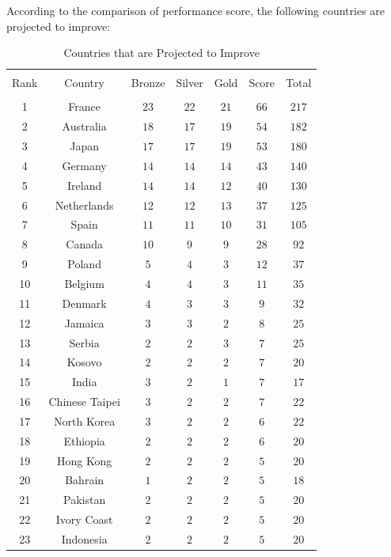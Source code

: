 \documentclass{mcmthesis}
\begin{document}
According to the comparison of performance score, the following countries are projected to improve:

\begin{longtable}{@{\extracolsep{5pt}} ccccccc} 
  \caption{Countries that are Projected to Improve} 
  \label{} 
\\[-1.8ex]\hline 
\hline \\[-1.8ex] 
Rank & Country & Bronze & Silver & Gold & Score & Total \\ 
\hline \\[-1.8ex] 
1 & France & $23$ & $22$ & $21$ & $66$ & $217$ \\ 
2 & Australia & $18$ & $17$ & $19$ & $54$ & $182$ \\ 
3 & Japan & $17$ & $17$ & $19$ & $53$ & $180$ \\ 
4 & Germany & $14$ & $14$ & $14$ & $43$ & $140$ \\ 
5 & Ireland & $14$ & $14$ & $12$ & $40$ & $130$ \\ 
6 & Netherlands & $12$ & $12$ & $13$ & $37$ & $125$ \\ 
7 & Spain & $11$ & $11$ & $10$ & $31$ & $105$ \\ 
8 & Canada & $10$ & $9$ & $9$ & $28$ & $92$ \\ 
9 & Poland & $5$ & $4$ & $3$ & $12$ & $37$ \\ 
10 & Belgium & $4$ & $4$ & $3$ & $11$ & $35$ \\ 
11 & Denmark & $4$ & $3$ & $3$ & $9$ & $32$ \\ 
12 & Jamaica & $3$ & $3$ & $2$ & $8$ & $25$ \\ 
13 & Serbia & $2$ & $2$ & $3$ & $7$ & $25$ \\ 
14 & Kosovo & $2$ & $2$ & $2$ & $7$ & $20$ \\ 
15 & India & $3$ & $2$ & $1$ & $7$ & $17$ \\ 
16 & Chinese Taipei & $3$ & $2$ & $2$ & $7$ & $22$ \\ 
17 & North Korea & $3$ & $2$ & $2$ & $6$ & $22$ \\ 
18 & Ethiopia & $2$ & $2$ & $2$ & $6$ & $20$ \\ 
19 & Hong Kong & $2$ & $2$ & $2$ & $5$ & $20$ \\ 
20 & Bahrain & $1$ & $2$ & $2$ & $5$ & $18$ \\ 
21 & Pakistan & $2$ & $2$ & $2$ & $5$ & $20$ \\ 
22 & Ivory Coast & $2$ & $2$ & $2$ & $5$ & $20$ \\ 
23 & Indonesia & $2$ & $2$ & $2$ & $5$ & $20$ \\ 

\end{longtable}
\end{document}
